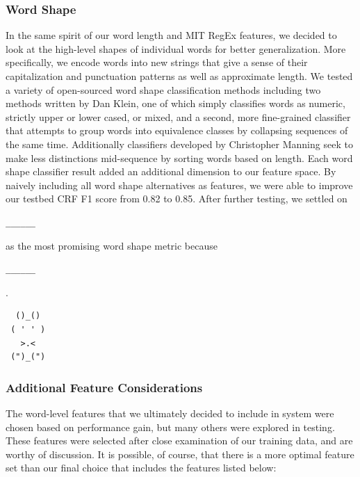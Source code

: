 \documentclass[preprint]{style}
\begin{document}
\subsubsection{Word Shape}
In the same spirit of our word length and MIT RegEx features, we decided to look at the high-level shapes of individual words for better generalization. More specifically, we encode words into new strings that give a sense of their capitalization and punctuation patterns as well as approximate length. We tested a variety of open-sourced word shape classification methods including two methods written by Dan Klein, one of which simply classifies words as numeric, strictly upper or lower cased, or mixed, and a second, more fine-grained classifier that attempts to group words into equivalence classes by collapsing sequences of the same time. Additionally classifiers developed by Christopher Manning seek to make less distinctions mid-sequence by sorting words based on length. Each word shape classifier result added an additional dimension to our feature space. By naively including all word shape alternatives as features, we were able to improve our testbed CRF F1 score from 0.82 to 0.85. After further testing, we settled on \begin{verbatim}______\end{verbatim} as the most promising word shape metric because \begin{verbatim}______\end{verbatim}.
\begin{verbatim}
  ()_()
 ( ' ' )
   >.<
 (")_(")
\end{verbatim}

\subsubsection{Additional Feature Considerations}
The word-level features that we ultimately decided to include in system were chosen based on performance gain, but many others were explored in testing. These features were selected after close examination of our training data, and are worthy of discussion. It is possible, of course, that there is a more optimal feature set than our final choice that includes the features listed below:
\end{document}

